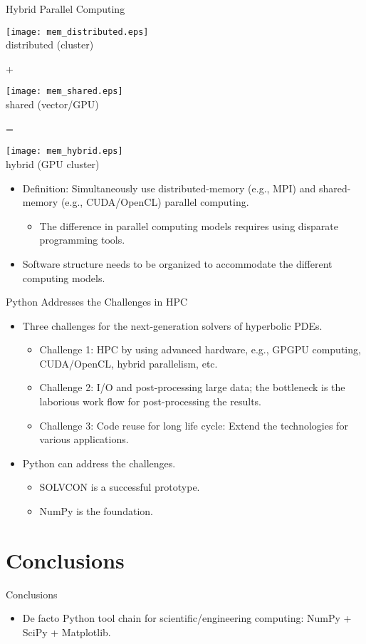 \documentclass[dvips,xcolor=pst]{beamer}
\begin{document}
\begin{frame}{
%
Hybrid Parallel Computing
%
}
\begin{minipage}[c]{\textwidth}\centering
\parbox{0.3\textwidth}{\centering
\texttt{[image: mem\_distributed.eps]} \\ distributed
(cluster)}
+ 
\parbox{0.3\textwidth}{\centering 
\texttt{[image: mem\_shared.eps]} \\ shared (vector/GPU)}
= 
\parbox{0.3\textwidth}{\centering
\texttt{[image: mem\_hybrid.eps]} \\ hybrid (GPU cluster)}
\end{minipage}
\begin{itemize}
  \item Definition: Simultaneously use distributed-memory (e.g., MPI) and
  shared-memory (e.g., CUDA/OpenCL) parallel computing.
  \begin{itemize}
    \item The difference in parallel computing models requires using disparate
    programming tools.
  \end{itemize}
  \item Software structure needs to be organized to accommodate the different
  computing models.
\end{itemize}
\end{frame}

\begin{frame}{
%
Python Addresses the Challenges in HPC
%
} \large
\begin{itemize}
  \item Three challenges for the next-generation solvers of hyperbolic PDEs.
  \begin{itemize} \large
    \item \alert{Challenge 1}: HPC by using advanced hardware, e.g., GPGPU
    computing, CUDA/OpenCL, hybrid parallelism, etc.
    \item \alert{Challenge 2}: I/O and post-processing large data; the
    bottleneck is the laborious work flow for post-processing the results.
    \item \alert{Challenge 3}: Code reuse for long life cycle: Extend the
    technologies for various applications.
  \end{itemize}
  \item Python can address the challenges.
  \begin{itemize} \large
    \item SOLVCON is a successful prototype.
    \item NumPy is the foundation.
  \end{itemize}
\end{itemize}
\end{frame}

\section{Conclusions}

\begin{frame}{
%
Conclusions
%
}
\begin{itemize}
  \item De facto Python tool chain for scientific/engineering computing: NumPy
  + SciPy + Matplotlib.
\end{itemize}
\end{frame}
\end{document}
